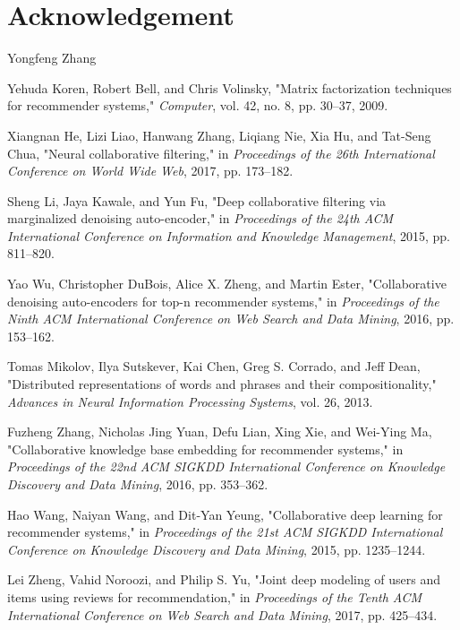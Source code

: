\documentclass[sigconf]{acmart}
\begin{document}
\section*{Acknowledgement}
Yongfeng Zhang


\balance

\begin{thebibliography}{99}

Yehuda Koren, Robert Bell, and Chris Volinsky, 
"Matrix factorization techniques for recommender systems," 
\textit{Computer}, vol. 42, no. 8, pp. 30--37, 2009.

Xiangnan He, Lizi Liao, Hanwang Zhang, Liqiang Nie, Xia Hu, and Tat-Seng Chua, 
"Neural collaborative filtering," 
in \textit{Proceedings of the 26th International Conference on World Wide Web}, 2017, pp. 173--182.

Sheng Li, Jaya Kawale, and Yun Fu, 
"Deep collaborative filtering via marginalized denoising auto-encoder," 
in \textit{Proceedings of the 24th ACM International Conference on Information and Knowledge Management}, 2015, pp. 811--820.

Yao Wu, Christopher DuBois, Alice X. Zheng, and Martin Ester, 
"Collaborative denoising auto-encoders for top-n recommender systems," 
in \textit{Proceedings of the Ninth ACM International Conference on Web Search and Data Mining}, 2016, pp. 153--162.

Tomas Mikolov, Ilya Sutskever, Kai Chen, Greg S. Corrado, and Jeff Dean, 
"Distributed representations of words and phrases and their compositionality," 
\textit{Advances in Neural Information Processing Systems}, vol. 26, 2013.

Fuzheng Zhang, Nicholas Jing Yuan, Defu Lian, Xing Xie, and Wei-Ying Ma, 
"Collaborative knowledge base embedding for recommender systems," 
in \textit{Proceedings of the 22nd ACM SIGKDD International Conference on Knowledge Discovery and Data Mining}, 2016, pp. 353--362.

Hao Wang, Naiyan Wang, and Dit-Yan Yeung, 
"Collaborative deep learning for recommender systems," 
in \textit{Proceedings of the 21st ACM SIGKDD International Conference on Knowledge Discovery and Data Mining}, 2015, pp. 1235--1244.

Lei Zheng, Vahid Noroozi, and Philip S. Yu, 
"Joint deep modeling of users and items using reviews for recommendation," 
in \textit{Proceedings of the Tenth ACM International Conference on Web Search and Data Mining}, 2017, pp. 425--434.

\end{thebibliography}
\end{document}
